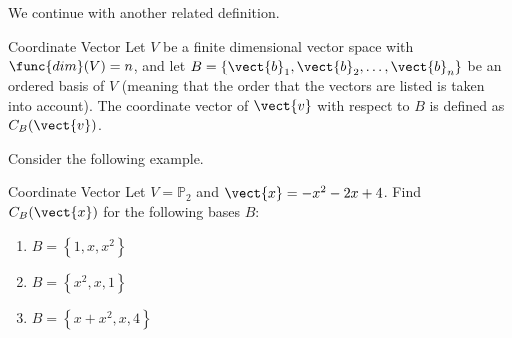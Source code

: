 We continue with another related definition.

\begin{definition}{Coordinate Vector}\label{def:coordinatevector}
Let $V$ be a finite dimensional vector space with $\func{dim}(V)=n$, and
let $B=\{\vect{b}_1, \vect{b}_2, \ldots, \vect{b}_n\}$ be an ordered basis of $V$ (meaning that the order that the
vectors are listed is taken into account).
The coordinate vector of $\vect{v}$ with respect to $B$ is defined
as $C_B(\vect{v})$.
\end{definition}

Consider the following example.

\begin{example}{Coordinate Vector}\label{exa:coordinatevector}
Let $V = \mathbb{P}_2$ and $\vect{x} = -x^2 -2x + 4$. 
Find $C_B(\vect{x})$ for the following bases $B$:
\begin{enumerate}
\item $B = \left\{ 1, x, x^2 \right\}$
\item $B = \left\{ x^2, x, 1 \right\}$
\item $B = \left\{ x + x^2 , x , 4 \right\}$
\end{enumerate}
\end{example}

